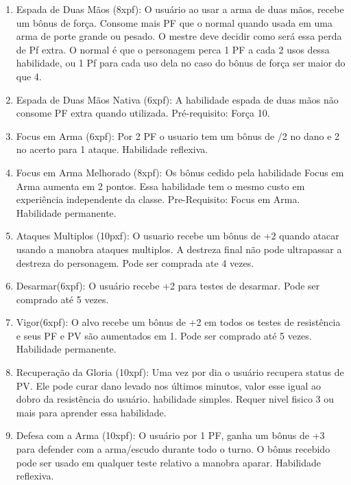 \begin{enumerate}
	\item Espada de Duas Mãos (8xpf): O usuário ao usar a arma de duas mãos, recebe um bônus de força. Consome mais PF que o normal quando usada em uma arma de porte grande ou pesado. O mestre deve decidir como será essa perda de Pf extra. O normal é que o personagem perca 1 PF a cada 2 usos dessa habilidade, ou 1 Pf para cada uso dela no caso do bônus de força ser maior do que 4.
	
		\item Espada de Duas Mãos Nativa (6xpf): A habilidade espada de duas mãos não consome PF extra quando utilizada. Pré-requisito: Força 10. 

	\item Focus em Arma (6xpf): Por 2 PF o usuario tem um bônus de /2 no dano e 2 no acerto para 1 ataque. Habilidade reflexiva.

	\item Focus em Arma Melhorado (8xpf): Os bônus cedido pela habilidade Focus em Arma aumenta em 2 pontos. Essa habilidade tem o mesmo custo em experiência independente da classe. Pre-Requisito: Focus em Arma. Habilidade permanente.

	\item Ataques Multiplos (10pxf): O usuario recebe um bônus de +2 quando atacar usando a manobra ataques multiplos. A destreza final não pode ultrapassar a destreza do personagem. Pode ser comprada ate 4 vezes. 

	\item Desarmar(6xpf): O usuário recebe +2 para testes de desarmar. Pode ser comprado até 5 vezes.

	\item Vigor(6xpf): O alvo recebe um bônus de +2 em todos os testes de resistência e seus PF e PV são aumentados em 1. Pode ser comprado até 5 vezes. Habilidade permanente.

	\item Recuperação da Gloria (10xpf): Uma vez por dia o usuário recupera status de PV. Ele pode curar dano levado nos últimos minutos, valor esse igual ao dobro da resistência do usuário. habilidade simples. Requer nivel fisico 3 ou mais para aprender essa habilidade.

	\item Defesa com a Arma (10xpf): O usuário por 1 PF, ganha um bônus de +3 para defender com a arma/escudo durante todo o turno. O bônus recebido pode ser usado em qualquer teste relativo a manobra aparar. Habilidade reflexiva.
	

\end{enumerate}
